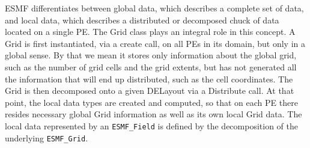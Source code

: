 ESMF differentiates between global data, which describes a complete set of data,
and local data, which describes a distributed or decomposed chuck of data located
on a single PE.  The Grid class plays an integral role in this concept.  A Grid
is first instantiated, via a create call, on all PEs in its domain, but only in
a global sense.  By that we mean it stores only information about the global grid,
such as the number of grid cells and the grid extents, but has not generated all
the information that will end up distributed, such as the cell coordinates.  The
Grid is then decomposed onto a given DELayout via a Distribute call.  At that
point, the local data types are created and computed, so that on each PE there
resides necessary global Grid information as well as its own local Grid data.
The local data represented by an {\tt ESMF\_Field} is defined by the decomposition
of the underlying {\tt ESMF\_Grid}.

